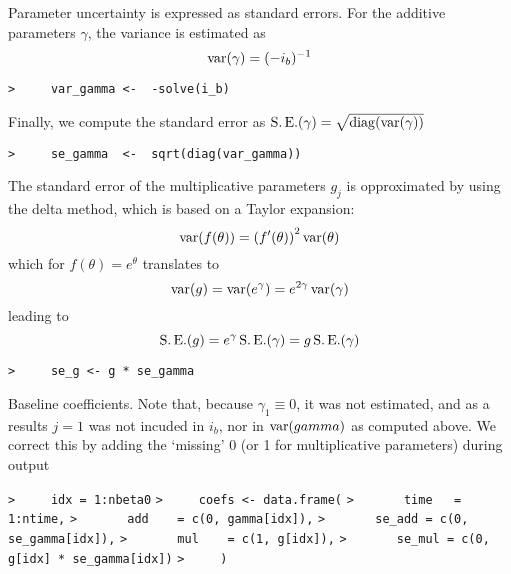 \documentclass[a4paper]{article}
\begin{document}
Parameter uncertainty is expressed as standard errors.
For the additive parameters $\gamma$, the variance is estimated as
$$ \operatorname{var}(\gamma) = (-i_b)^{-1} $$\par
\verb~>     var_gamma <-  -solve(i_b)~\par
Finally, we compute the standard error as $\operatorname{S.E.}(\gamma) = \sqrt{\operatorname{diag}(\operatorname{var}(\gamma))}$\par
\verb~>     se_gamma  <-  sqrt(diag(var_gamma))~\par

The standard error of the multiplicative parameters $g_j$ is opproximated by
using the delta method, which is based on a Taylor expansion:
\begin{equation}
  \operatorname{var}(f(\theta)) = \left(f'(\theta)\right)^2 \operatorname{var}(\theta)
\end{equation}
which for $f(\theta)=e^\theta$ translates to
$$ \operatorname{var}(g) = \operatorname{var}(e^{\gamma}) = e^{2\gamma} \operatorname{var}(\gamma) $$
leading to
$$ \operatorname{S.E.}(g) = e^{\gamma} \operatorname{S.E.}(\gamma) = g \operatorname{S.E.}(\gamma) $$\par
\verb~>     se_g <- g * se_gamma~\par

Baseline coefficients.
Note that, because $\gamma_1\equiv0$, it was not estimated,
and as a results $j=1$ was not incuded in $i_b$, nor in $\operatorname{var}(gamma)$ as computed above.
We correct this by adding the `missing' 0 (or 1 for multiplicative parameters) during output\par
\verb~>     idx = 1:nbeta0~\newline
\verb~>     coefs <- data.frame(~\newline
\verb~>       time   = 1:ntime,~\newline
\verb~>       add    = c(0, gamma[idx]),~\newline
\verb~>       se_add = c(0, se_gamma[idx]),~\newline
\verb~>       mul    = c(1, g[idx]),~\newline
\verb~>       se_mul = c(0, g[idx] * se_gamma[idx])~\newline
\verb~>     )~\par
\end{document}
